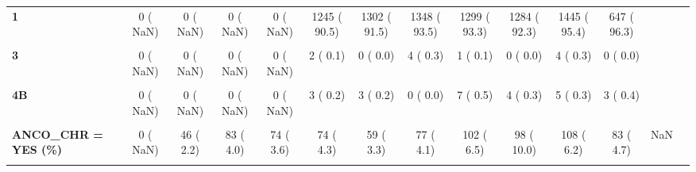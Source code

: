 \documentclass[
]{article}
\begin{document}
\begin{table}[H]
\begin{tabular}[t]{>{\raggedright\arraybackslash}p{5em}ccccccccccccc}
\textbf{1} & 0 (  NaN) & 0 (  NaN) & 0 (  NaN) & 0 (  NaN) & 1245 ( 90.5) & 1302 ( 91.5) & 1348 ( 93.5) & 1299 ( 93.3) & 1284 ( 92.3) & 1445 ( 95.4) & 647 ( 96.3) &  & \\
\textbf{\cellcolor{gray!10}{2}} & \cellcolor{gray!10}{0 (  NaN)} & \cellcolor{gray!10}{0 (  NaN)} & \cellcolor{gray!10}{0 (  NaN)} & \cellcolor{gray!10}{0 (  NaN)} & \cellcolor{gray!10}{71 (  5.2)} & \cellcolor{gray!10}{77 (  5.4)} & \cellcolor{gray!10}{65 (  4.5)} & \cellcolor{gray!10}{59 (  4.2)} & \cellcolor{gray!10}{60 (  4.3)} & \cellcolor{gray!10}{48 (  3.2)} & \cellcolor{gray!10}{21 (  3.1)} & \cellcolor{gray!10}{} & \cellcolor{gray!10}{}\\
\textbf{3} & 0 (  NaN) & 0 (  NaN) & 0 (  NaN) & 0 (  NaN) & 2 (  0.1) & 0 (  0.0) & 4 (  0.3) & 1 (  0.1) & 0 (  0.0) & 4 (  0.3) & 0 (  0.0) &  & \\
\textbf{\cellcolor{gray!10}{4A}} & \cellcolor{gray!10}{0 (  NaN)} & \cellcolor{gray!10}{0 (  NaN)} & \cellcolor{gray!10}{0 (  NaN)} & \cellcolor{gray!10}{0 (  NaN)} & \cellcolor{gray!10}{31 (  2.3)} & \cellcolor{gray!10}{29 (  2.0)} & \cellcolor{gray!10}{11 (  0.8)} & \cellcolor{gray!10}{16 (  1.1)} & \cellcolor{gray!10}{37 (  2.7)} & \cellcolor{gray!10}{3 (  0.2)} & \cellcolor{gray!10}{1 (  0.1)} & \cellcolor{gray!10}{} & \cellcolor{gray!10}{}\\
\textbf{4B} & 0 (  NaN) & 0 (  NaN) & 0 (  NaN) & 0 (  NaN) & 3 (  0.2) & 3 (  0.2) & 0 (  0.0) & 7 (  0.5) & 4 (  0.3) & 5 (  0.3) & 3 (  0.4) &  & \\
\textbf{\cellcolor{gray!10}{5}} & \cellcolor{gray!10}{0 (  NaN)} & \cellcolor{gray!10}{0 (  NaN)} & \cellcolor{gray!10}{0 (  NaN)} & \cellcolor{gray!10}{0 (  NaN)} & \cellcolor{gray!10}{24 (  1.7)} & \cellcolor{gray!10}{12 (  0.8)} & \cellcolor{gray!10}{14 (  1.0)} & \cellcolor{gray!10}{11 (  0.8)} & \cellcolor{gray!10}{6 (  0.4)} & \cellcolor{gray!10}{10 (  0.7)} & \cellcolor{gray!10}{0 (  0.0)} & \cellcolor{gray!10}{} & \cellcolor{gray!10}{}\\
\textbf{ANCO\_CHR = YES (\%)} & 0 (  NaN) & 46 (  2.2) & 83 (  4.0) & 74 (  3.6) & 74 (  4.3) & 59 (  3.3) & 77 (  4.1) & 102 (  6.5) & 98 ( 10.0) & 108 (  6.2) & 83 (  4.7) & NaN & \\
\textbf{\cellcolor{gray!10}{ANGIO = YES (\%)}} & \cellcolor{gray!10}{1047 ( 58.4)} & \cellcolor{gray!10}{1410 ( 68.8)} & \cellcolor{gray!10}{1582 ( 75.5)} & \cellcolor{gray!10}{1685 ( 81.2)} & \cellcolor{gray!10}{1524 ( 87.3)} & \cellcolor{gray!10}{1596 ( 89.7)} & \cellcolor{gray!10}{1676 ( 88.9)} & \cellcolor{gray!10}{1671 ( 93.3)} & \cellcolor{gray!10}{1655 ( 93.1)} & \cellcolor{gray!10}{1653 ( 94.5)} & \cellcolor{gray!10}{1647 ( 93.8)} & \cellcolor{gray!10}{<0.001} & \cellcolor{gray!10}{}\\

\end{tabular}
\end{table}
\end{document}
